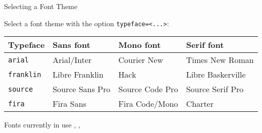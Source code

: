 \documentclass[10pt]{beamer}
\begin{document}
\begin{frame}[fragile]{Selecting a Font Theme}

Select a font theme with the option \texttt{typeface=<...>}:

\begin{center}
\begin{adjustbox}{max width=\textwidth}
\begin{tabular}{llll}
\toprule
\bf Typeface & \bf Sans font & \bf Mono font & \bf Serif font \\
\midrule
    \texttt{arial} & Arial/Inter & Courier New & Times New Roman \\
    \texttt{franklin} & Libre Franklin & Hack & Libre Baskerville \\
    \texttt{source} & Source Sans Pro & Source Code Pro & Source Serif Pro \\
    \texttt{fira} & Fira Sans & Fira Code/Mono & Charter \\
\bottomrule
\end{tabular}
\end{adjustbox}
\end{center}


\bigskip
\begin{block}{Fonts currently in use}
\makeatletter{\f@family}, {\tt\f@family}, {\rmfamily\f@family}\makeatother
\end{block}

\end{frame}
\end{document}
